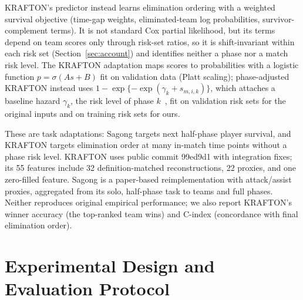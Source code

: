 \documentclass[sigconf,anonymous]{acmart}
\begin{document}
KRAFTON's predictor instead learns elimination ordering with a weighted survival objective (time-gap weights, eliminated-team log probabilities, survivor-complement terms). It is not standard Cox partial likelihood, but its terms depend on team scores only through risk-set ratios, so it is shift-invariant within each risk set (Section~\ref{sec:account}) and identifies neither a phase nor a match risk level. The KRAFTON adaptation maps scores to probabilities with a logistic function $p=\sigma(A s+B)$ fit on validation data (Platt scaling); phase-adjusted KRAFTON instead uses $1-\exp\{-\exp(\gamma_k+s_{m,i,k})\}$, which attaches a baseline hazard $\gamma_k$, the risk level of phase $k$~\cite{PrenticeGloeckler78}, fit on validation risk sets for the original inputs and on training risk sets for ours.

These are task adaptations: Sagong targets next half-phase player survival, and KRAFTON targets elimination order at many in-match time points without a phase risk level. KRAFTON uses public commit 99ed9d1 with integration fixes; its 55 features include 32 definition-matched reconstructions, 22 proxies, and one zero-filled feature. Sagong is a paper-based reimplementation with attack/assist proxies, aggregated from its solo, half-phase task to teams and full phases. Neither reproduces original empirical performance; we also report KRAFTON's winner accuracy (the top-ranked team wins) and C-index (concordance with final elimination order).

\section{Experimental Design and Evaluation Protocol}
\label{sec:method:evaluation}
\end{document}
